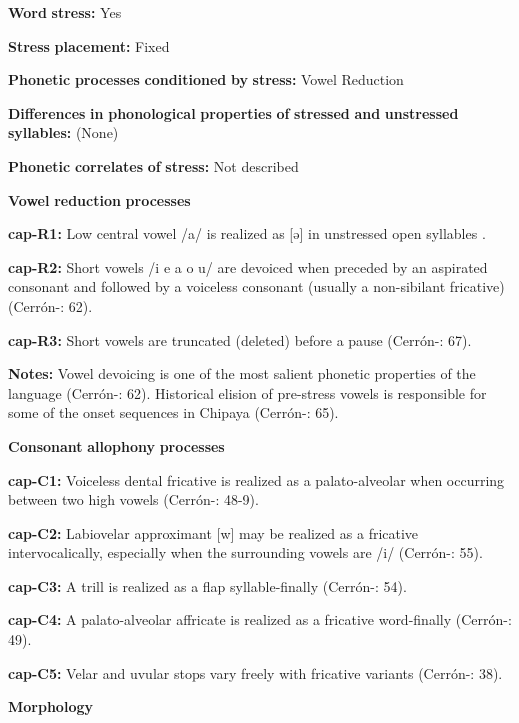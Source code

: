 \textbf{Word} \textbf{stress:} Yes

\textbf{Stress} \textbf{placement:} Fixed

\textbf{Phonetic} \textbf{processes} \textbf{conditioned} \textbf{by} \textbf{stress:} Vowel Reduction

\textbf{Differences} \textbf{in} \textbf{phonological} \textbf{properties} \textbf{of} \textbf{stressed} \textbf{and} \textbf{unstressed} \textbf{syllables:} (None)

\textbf{Phonetic} \textbf{correlates} \textbf{of} \textbf{stress:} Not described

\textbf{Vowel} \textbf{reduction} \textbf{processes}

\textbf{cap-R1:} Low central vowel /a/ is realized as [ə] in unstressed open syllables \citep[301]{Olson1967}.

\textbf{cap-R2:} Short vowels /i e a o u/ are devoiced when preceded by an aspirated consonant and followed by a voiceless consonant (usually a non-sibilant fricative) (Cerrón-\citealt{Palomino2006}: 62).

\textbf{cap-R3:} Short vowels are truncated (deleted) before a pause (Cerrón-\citealt{Palomino2006}: 67).

\textbf{Notes:} Vowel devoicing is one of the most salient phonetic properties of the language (Cerrón-\citealt{Palomino2006}: 62). Historical elision of pre-stress vowels is responsible for some of the onset sequences in Chipaya (Cerrón-\citealt{Palomino2006}: 65).

\textbf{Consonant} \textbf{allophony} \textbf{processes}

\textbf{cap-C1:} Voiceless dental fricative is realized as a palato-alveolar when occurring between two high vowels (Cerrón-\citealt{Palomino2006}: 48-9).

\textbf{cap-C2:} Labiovelar approximant [w] may be realized as a fricative intervocalically, especially when the surrounding vowels are /i/ (Cerrón-\citealt{Palomino2006}: 55).

\textbf{cap-C3:} A trill is realized as a flap syllable-finally (Cerrón-\citealt{Palomino2006}: 54).

\textbf{cap-C4:} A palato-alveolar affricate is realized as a fricative word-finally (Cerrón-\citealt{Palomino2006}: 49).

\textbf{cap-C5:} Velar and uvular stops vary freely with fricative variants (Cerrón-\citealt{Palomino2006}: 38).

\textbf{Morphology}

